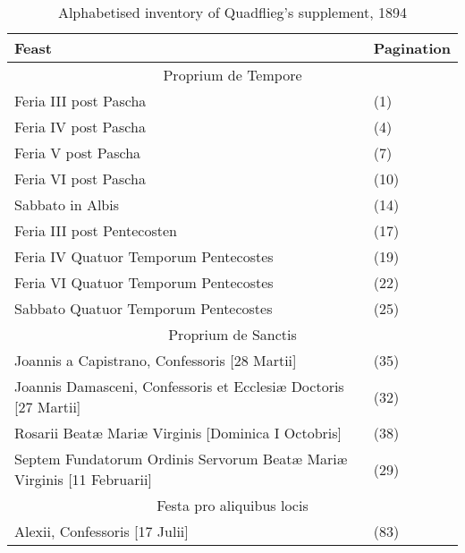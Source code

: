 \begin{table}[ht]
\centering
\footnotesize
\caption{Alphabetised inventory of Quadflieg's supplement, 1894}
\label{tab:quadflieg-supplement}
\begin{tabular}{@{}ll@{}}
\toprule
Feast                                                                    & Pagination \\ \midrule
\multicolumn{2}{c}{Proprium de Tempore}                                               \\
Feria III post Pascha                                                    & (1)        \\
Feria IV post Pascha                                                     & (4)        \\
Feria V post Pascha                                                      & (7)        \\
Feria VI post Pascha                                                     & (10)       \\
Sabbato in Albis                                                         & (14)       \\
Feria III post Pentecosten                                               & (17)       \\
Feria IV Quatuor Temporum Pentecostes                                    & (19)       \\
Feria VI Quatuor Temporum Pentecostes                                    & (22)       \\
Sabbato Quatuor Temporum Pentecostes                                     & (25)       \\ \midrule
\multicolumn{2}{c}{Proprium de Sanctis}                                               \\
Joannis a Capistrano, Confessoris [28 Martii]                            & (35)       \\
Joannis Damasceni, Confessoris et Ecclesiæ Doctoris [27 Martii]          & (32)       \\
Rosarii Beatæ Mariæ Virginis [Dominica I Octobris]                       & (38)       \\
Septem Fundatorum Ordinis Servorum Beatæ Mariæ Virginis [11 Februarii]   & (29)       \\ \midrule
\multicolumn{2}{c}{Festa pro aliquibus locis}                                         \\
Alexii, Confessoris [17 Julii]                                           & (83)       \\

\end{tabular}
\end{table}
